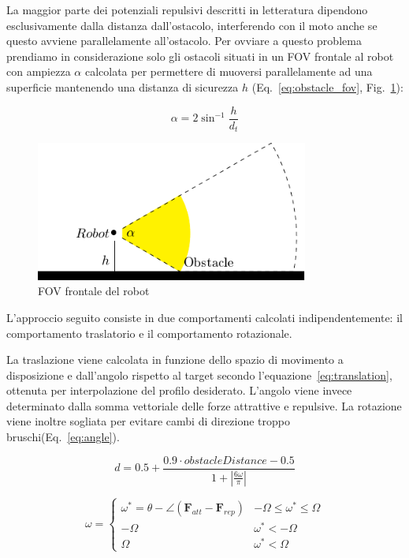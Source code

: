 \documentclass[a4paper]{article}
\begin{document}
	La maggior parte dei potenziali repulsivi descritti in letteratura
	dipendono esclusivamente dalla distanza dall'ostacolo, interferendo con il
	moto anche se questo avviene parallelamente all'ostacolo. Per ovviare a
	questo problema prendiamo in considerazione solo gli ostacoli situati in un
	FOV frontale al robot con ampiezza $ \alpha  $ calcolata per permettere di
	muoversi parallelamente ad una superficie mantenendo una distanza di
	sicurezza $ h $ (Eq.~\ref{eq:obstacle_fov}, Fig.~\ref{fig:obstacle_fov}): 

	\begin{equation}\label{eq:obstacle_fov}
		\alpha = {2}\sin^{-1}{\frac{h}{d_t}}
	\end{equation}

	\begin{figure}[H]
		\centering
		\includegraphics[width=0.8\textwidth]{./img/obstacle_fov.pdf}
		\caption{FOV frontale del robot}
		\label{fig:obstacle_fov}
	\end{figure}

	L'approccio seguito consiste in due comportamenti calcolati
	indipendentemente: il comportamento traslatorio e il comportamento
	rotazionale.

	La traslazione viene calcolata in funzione dello spazio di movimento a
	disposizione e dall'angolo rispetto al target secondo
	l'equazione~\ref{eq:translation}, ottenuta per interpolazione del profilo
	desiderato. L'angolo viene invece determinato dalla somma vettoriale delle
	forze attrattive e repulsive. La rotazione viene inoltre sogliata per
	evitare cambi di direzione troppo bruschi(Eq.~\ref{eq:angle}).

	\begin{equation}\label{eq:translation}
		d = 0.5 + \frac	{0.9\cdot obstacleDistance - 0.5}
		{1 + \left|
				\frac{6\omega}{\pi}
		\right|  } 
	\end{equation}
	
	\begin{equation}\label{eq:angle}
		\omega = \begin{cases}
			\omega^*=\theta - \angle\left( \textbf{F}_{att} - \textbf{F}_{rep} \right)  & -\Omega \le \omega^* \le \Omega \\
			-\Omega & \omega^* < -\Omega \\
			\Omega & \omega^* < \Omega

		\end{cases}	\end{equation}
	
\end{document}

